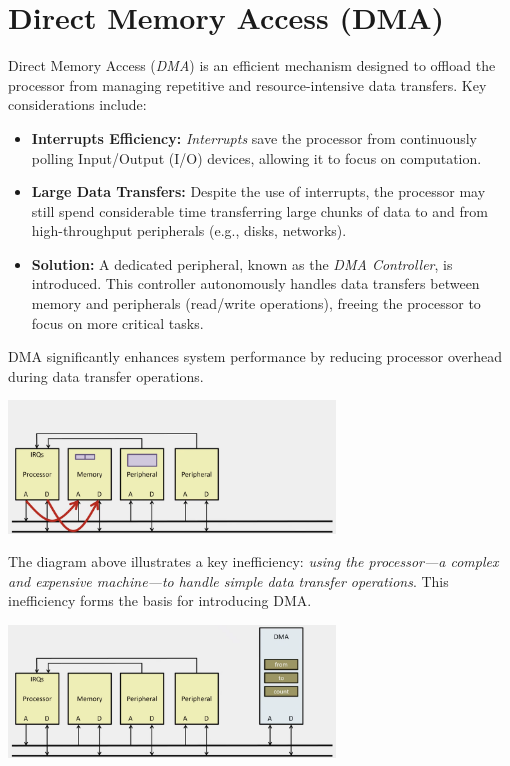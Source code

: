 \section{Direct Memory Access (DMA)}

Direct Memory Access (\textit{DMA}) is an efficient mechanism designed to offload the processor from managing repetitive and resource-intensive data transfers. Key considerations include:

\begin{itemize}
    \item \textbf{Interrupts Efficiency:} \textit{Interrupts} save the processor from continuously polling Input/Output (I/O) devices, allowing it to focus on computation.
    \item \textbf{Large Data Transfers:} Despite the use of interrupts, the processor may still spend considerable time transferring large chunks of data to and from high-throughput peripherals (e.g., disks, networks).
    \item \textbf{Solution:} A dedicated peripheral, known as the \textit{DMA Controller}, is introduced. This controller autonomously handles data transfers between memory and peripherals (read/write operations), freeing the processor to focus on more critical tasks.
\end{itemize}

\vspace{0.5cm}
\noindent
DMA significantly enhances system performance by reducing processor overhead during data transfer operations.

\vspace{0.8cm}
\begin{center} 
    \includegraphics[width=0.65\textwidth]{chapters/chapter2c/images/DMA.png}
\end{center}
\vspace{0.5cm}

The diagram above illustrates a key inefficiency: \textit{using the processor—a complex and expensive machine—to handle simple data transfer operations}. This inefficiency forms the basis for introducing DMA. 

\vspace{1cm}
\begin{center}
    \includegraphics[width=0.65\textwidth]{chapters/chapter2c/images/DMA2.png}
\end{center}
\vspace{0.5cm}

